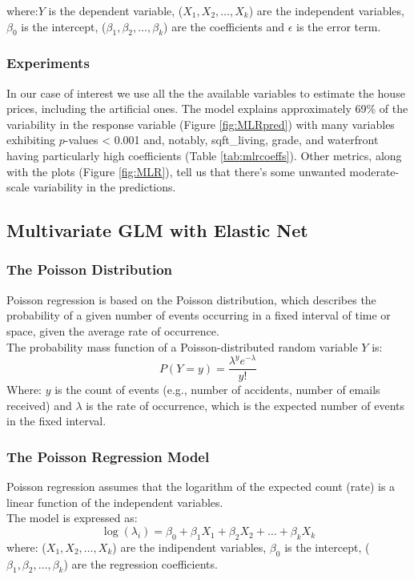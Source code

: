 \documentclass[a4paper, 11pt]{article}
\begin{document}
\begin{multicols}{2}
where:$Y$ is the dependent variable, ($X_1, X_2,\dots,X_k$) are the independent variables, $\beta_0$ is the intercept, ($\beta_1,\beta_2, \dots, \beta_k$) are the coefficients and $\epsilon$ is the error term.\\

\subsubsection*{Experiments}
In our case of interest we use all the the available variables to estimate the house prices, including the artificial ones. The model explains approximately 69\% of the variability in the response variable (Figure \ref{fig:MLRpred}) with many variables exhibiting \( p \)-values < 0.001 and, notably, sqft\_living, grade, and waterfront having particularly high coefficients (Table \ref{tab:mlrcoeffs}). Other metrics, along with the plots (Figure \ref{fig:MLR}), tell us that there's some unwanted moderate-scale variability in the predictions.


\subsection{Multivariate GLM with Elastic Net} \vspace{-3pt}
\subsubsection*{The Poisson Distribution}
Poisson regression is based on the Poisson distribution, which describes the probability of a given number of events occurring in a fixed interval of time or space, given the average rate of occurrence.\\
The probability mass function of a Poisson-distributed random variable $Y$ is:
\begin{equation}
P(Y=y)= \frac{\lambda^ye^{-\lambda}}{y!}
\end{equation}
Where: $y$ is the count of events (e.g., number of accidents, number of emails received) and $\lambda$ is the rate of occurrence, which is the expected number of events in the fixed interval.
\subsubsection*{The Poisson Regression Model}
Poisson regression assumes that the logarithm of the expected count (rate) is a linear function of the independent variables.\\
The model is expressed as:
\begin{equation}
\log(\lambda_i)=\beta_0+\beta_1X_1+\beta_2X_2+\dots+\beta_kX_k
\end{equation}
where: ($X_1, X_2,\dots,X_k$) are the indipendent variables, $\beta_0$ is the intercept, ($\beta_1,\beta_2, \dots, \beta_k$) are the regression coefficients.


\end{multicols}
\end{document}
